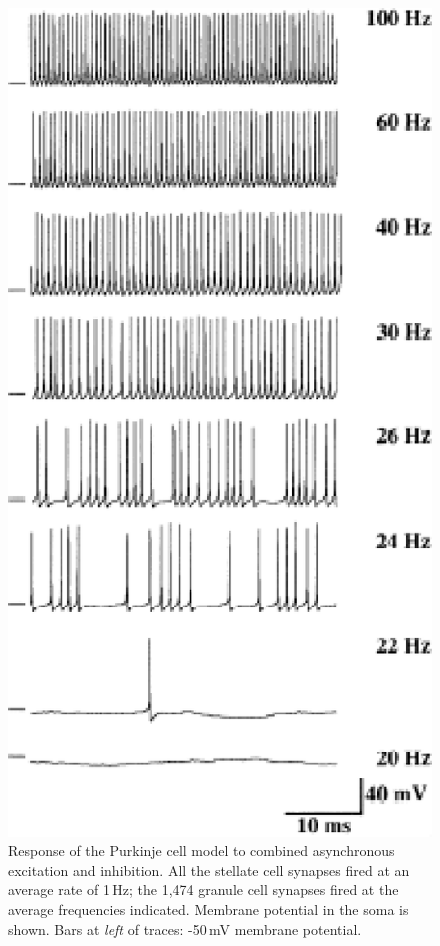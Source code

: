 \documentclass[12pt]{article}
\begin{document}
\begin{figure}[h]
\centering
   \includegraphics[scale=0.75]{figures/Fig.2.7.eps}
   \caption{Response of the Purkinje cell model to combined asynchronous excitation and inhibition. All the stellate cell synapses fired at an average rate of 1\,Hz; the 1,474 granule cell synapses fired at the average frequencies indicated. Membrane potential in the soma is shown. Bars at {\em left} of traces: -50\,mV membrane potential.}
   \label{fig:DS2.7}
\end{figure}
\end{document}
